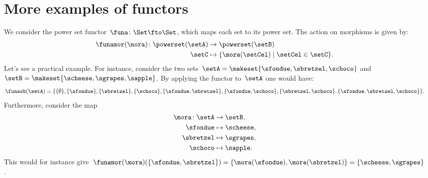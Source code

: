 
\section{More examples of functors}

\begin{example}
	\label{ex:powerset_functor}
	We consider the power set functor~$\funa\colon \Set \fto \Set$, which maps each set to its power set.
	The action on morphisms is given by:
	\begin{equation*}
		\begin{aligned}
			\funamor(\mora)\colon \powerset(\setA) & \to \powerset(\setB)                               \\
			\setC                                  & \mapsto \{\mora(\setCel) \mid \setCel \in \setC\}.
		\end{aligned}
	\end{equation*}
	Let's see a practical example.
	For instance, consider the two sets~$\setA = \makeset{\sfondue, \sbretzel, \schoco}$ and~$\setB = \makeset{\scheese,\sgrapes,\sapple}$.
	By applying the functor to~$\setA$ one would have:
	\begin{equation*}
		\funaob(\setA)
		=
		\{
		\{\emptyset\},
		\{\sfondue\},
		\{\sbretzel\},
		\{\schoco\},
		\{\sfondue,\sbretzel\},
		\{\sfondue,\schoco\},
		\{\sbretzel,\schoco\},
		\{\sfondue,\sbretzel,\schoco\}
		\}.
	\end{equation*}
	Furthermore, consider the map
	\begin{equation*}
		\begin{aligned}
			\mora \colon \setA & \to \setB,        \\
			\sfondue           & \mapsto \scheese, \\
			\sbretzel          & \mapsto \sgrapes, \\
			\schoco            & \mapsto \sapple.
		\end{aligned}
	\end{equation*}
	This would for instance give~$\funamor(\mora)(\{\sfondue,\sbretzel\})=\{\mora(\sfondue),\mora(\sbretzel)\}=\{\scheese,\sgrapes\}$.


\end{example}

